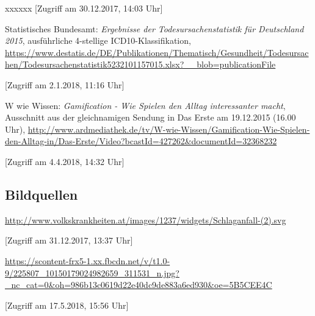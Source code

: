 \begin{thebibliography}{xxxxxx}
[Zugriff am 30.12.2017, 14:03 Uhr]

 Statistisches Bundesamt: \textit{Ergebnisse der Todesursachenstatistik für Deutschland 2015}, ausführliche 4-stellige ICD10-Klassifikation, \\ \url{https://www.destatis.de/DE/Publikationen/Thematisch/Gesundheit/Todesursachen/Todesursachenstatistik5232101157015.xlsx?__blob=publicationFile}

[Zugriff am 2.1.2018, 11:16 Uhr]

 W wie Wissen: \textit{Gamification - Wie Spielen den Alltag interessanter macht}, Ausschnitt aus der gleichnamigen Sendung in Das Erste am 19.12.2015 (16.00 Uhr), \url{http://www.ardmediathek.de/tv/W-wie-Wissen/Gamification-Wie-Spielen-den-Alltag-in/Das-Erste/Video?bcastId=427262&documentId=32368232}

[Zugriff am 4.4.2018, 14:32 Uhr]

\subsection*{Bildquellen}

 \url{http://www.volkskrankheiten.at/images/1237/widgets/Schlaganfall-(2).svg}

[Zugriff am 31.12.2017, 13:37 Uhr]

 \url{https://scontent-frx5-1.xx.fbcdn.net/v/t1.0-9/225807_10150179024982659_311531_n.jpg?_nc_cat=0&oh=986b13c0619d22e40dc9de883a6ed930&oe=5B5CEE4C}

[Zugriff am 17.5.2018, 15:56 Uhr]
\end{thebibliography}
